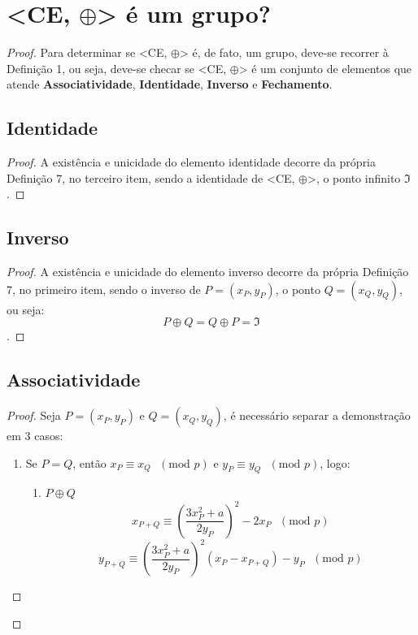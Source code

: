 \documentclass[14pt, oneside]{book}
\theoremstyle{definition}
\begin{document}
            \section{<CE, $\oplus$> é um grupo?}
                \begin{proof} 
                    Para determinar se <CE, $\oplus$> é, de fato, um grupo, deve-se recorrer à Definição 1, ou seja, deve-se checar se <CE, $\oplus$> é um conjunto de elementos que atende \textbf{Associatividade}, \textbf{Identidade}, \textbf{Inverso} e \textbf{Fechamento}.
                
                \subsection{Identidade}
                    \begin{proof} 
                        A existência e unicidade do elemento identidade decorre da própria Definição 7, no terceiro item, sendo a identidade de <CE, $\oplus$>, o ponto infinito $\Im$. 
                    \end{proof}
                \subsection{Inverso}
                    \begin{proof} 
                        A existência e unicidade do elemento inverso decorre da própria Definição 7, no primeiro item, sendo o inverso de $P = (x_P, y_P)$, o ponto $Q=(x_Q,y_Q)$, ou seja:
                        $$P \oplus Q = Q \oplus P = \Im$$.
                    \end{proof}
                    
                \subsection{Associatividade}
                    \begin{proof}
                        Seja $P=(x_P,y_P)$ e $Q = (x_Q, y_Q)$, é necessário separar a demonstração em 3 casos:
                        \begin{enumerate}
                            \item Se $P=Q$, então $x_P \equiv  x_Q\textrm{ }(\textrm{mod }p)$ e $y_P \equiv y_Q\textrm{ }(\textrm{mod }p)$, logo:
                                \begin{enumerate}
                                    \item $P\oplus Q$ \\
                                    $$x_{P+Q} \equiv \left(\frac{3x_P^2 + a}{2y_P}\right)^2 -2x_P\textrm{ }(\textrm{mod }p)$$
                                    $$y_{P+Q} \equiv \left(\frac{3x_P^2 + a}{2y_P}\right)^2(x_P-x_{P+Q}) - y_P\textrm{ }(\textrm{mod }p)$$
                                    

\end{enumerate}
\end{enumerate}
\end{proof}
\end{proof}
\end{document}
